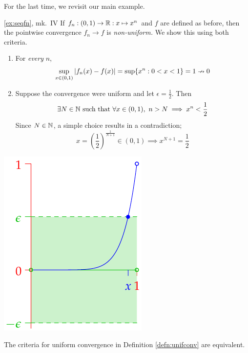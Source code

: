 For the last time, we revisit our main example.
\begin{example*}{\ref{ex:seqfn}, mk.\ IV}{}
If $f_n:(0,1)\to\mathbb{R}:x\mapsto x^n$ and $f$ are defined as before, then the pointwise convergence $f_n\to f$ is \emph{non-uniform.} We show this using both criteria.\smallbreak
\begin{minipage}{0.68\linewidth}\vspace{0pt}
\begin{enumerate}
  \item For \emph{every} $n$,
  \[\sup_{x\in(0,1)}\left| f_n(x)-f(x)\right| =\sup\{x^n:0<x<1\}=1 \nrightarrow 0\]
  \item Suppose the convergence were uniform and let %
   $\epsilon=\frac 12$. Then 
  \[\exists N\in\mathbb{N}\text{ such that }\forall x\in (0,1),\ n>N\implies x^n<\frac 12\]
  Since $N\in\mathbb{N}$, a simple choice results in a contradiction;
  \[x=\left(\frac 12\right)^{\frac 1{N+1}}\in(0,1)\implies x^{N+1}=\frac 12\]
\end{enumerate} 
  \end{minipage}
  \begin{minipage}{0.31\linewidth}\vspace{0pt}
	\flushright\includegraphics{unifconv2}
  \end{minipage}
\end{example*}


\goodbreak


\begin{thm}{}{}
The criteria for uniform convergence in Definition \ref{defn:unifconv} are equivalent.
\end{thm}

